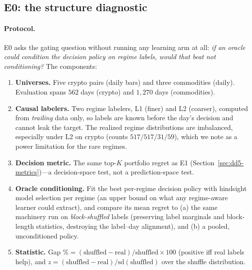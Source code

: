 \documentclass[11pt,a4paper]{article}
\theoremstyle{definition}
\theoremstyle{plain}
\begin{document}
\subsection{E0: the structure diagnostic}
\label{sec:dd5-e0}

\paragraph{Protocol.} E0 asks the gating question without running any
learning arm at all: \emph{if an oracle could condition the decision policy
on regime labels, would that beat not conditioning?} The components:

\begin{enumerate}
\item \textbf{Universes.} Five crypto pairs (daily bars) and three
commodities (daily). Evaluation spans $562$ days (crypto) and $1{,}270$
days (commodities).
\item \textbf{Causal labelers.} Two regime labelers, L1 (finer) and L2
(coarser), computed from \emph{trailing} data only, so labels are known
before the day's decision and cannot leak the target. The realized regime
distributions are imbalanced, especially under L2 on crypto
(counts $517/517/31/59$), which we note as a power limitation for the rare
regimes.
\item \textbf{Decision metric.} The same top-$K$ portfolio regret as E1
(Section~\ref{sec:dd5-metrics})---a decision-space test, not a
prediction-space test.
\item \textbf{Oracle conditioning.} Fit the best per-regime decision policy
with hindsight model selection per regime (an upper bound on what any
regime-aware learner could extract), and compare its mean regret to
(a) the same machinery run on \emph{block-shuffled} labels (preserving label
marginals and block-length statistics, destroying the label--day
alignment), and (b) a pooled, unconditioned policy.
\item \textbf{Statistic.} Gap $\% = (\text{shuffled} - \text{real}) /
\text{shuffled} \times 100$ (positive iff real labels help), and
$z = (\text{shuffled} - \text{real}) / \mathrm{sd}(\text{shuffled})$ over
the shuffle distribution.
\end{enumerate}
\end{document}
